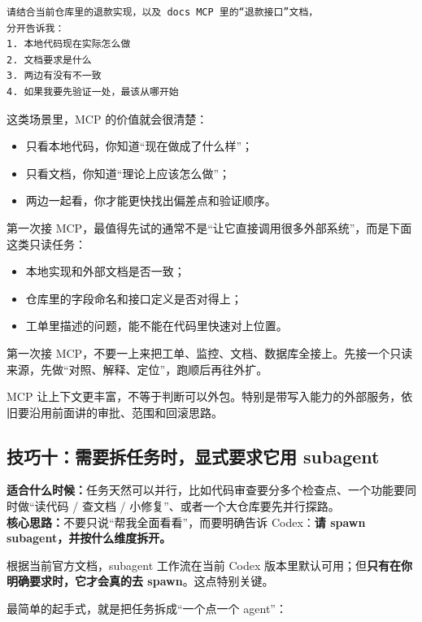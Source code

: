 \documentclass[UTF8,a4paper,12pt]{ctexart}
\begin{document}
\begin{lstlisting}[style=prompt]
请结合当前仓库里的退款实现，以及 docs MCP 里的“退款接口”文档，
分开告诉我：
1. 本地代码现在实际怎么做
2. 文档要求是什么
3. 两边有没有不一致
4. 如果我要先验证一处，最该从哪开始
\end{lstlisting}

这类场景里，MCP 的价值就会很清楚：
\begin{itemize}
  \item 只看本地代码，你知道“现在做成了什么样”；
  \item 只看文档，你知道“理论上应该怎么做”；
  \item 两边一起看，你才能更快找出偏差点和验证顺序。
\end{itemize}

第一次接 MCP，最值得先试的通常不是“让它直接调用很多外部系统”，而是下面这类只读任务：
\begin{itemize}
  \item 本地实现和外部文档是否一致；
  \item 仓库里的字段命名和接口定义是否对得上；
  \item 工单里描述的问题，能不能在代码里快速对上位置。
\end{itemize}

\begin{tipbox}
第一次接 MCP，不要一上来把工单、监控、文档、数据库全接上。先接一个只读来源，先做“对照、解释、定位”，跑顺后再往外扩。
\end{tipbox}

\begin{warnbox}
MCP 让上下文更丰富，不等于判断可以外包。特别是带写入能力的外部服务，依旧要沿用前面讲的审批、范围和回滚思路。
\end{warnbox}

\subsection{技巧十：需要拆任务时，显式要求它用 subagent}

\textbf{适合什么时候：}任务天然可以并行，比如代码审查要分多个检查点、一个功能要同时做“读代码 / 查文档 / 小修复”、或者一个大仓库要先并行探路。\\
\textbf{核心思路：}不要只说“帮我全面看看”，而要明确告诉 Codex：\textbf{请 spawn subagent，并按什么维度拆开。}

根据当前官方文档，subagent 工作流在当前 Codex 版本里默认可用；但\textbf{只有在你明确要求时，它才会真的去 spawn}。这点特别关键。

最简单的起手式，就是把任务拆成“一个点一个 agent”：
\end{document}
